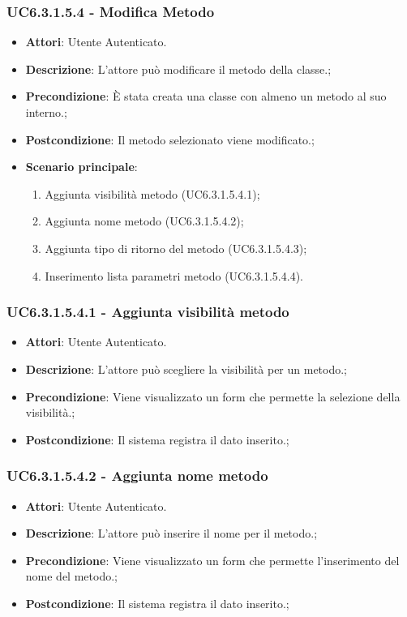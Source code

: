 \subsubsection{UC6.3.1.5.4 - Modifica Metodo} 
\label{sssec:UC6.3.1.5.4} 
\begin{itemize} 
\item \textbf{Attori}: Utente Autenticato.
\item \textbf{Descrizione}: L'attore può modificare il metodo della classe.;
\item \textbf{Precondizione}: È stata creata una classe con almeno un metodo al suo interno.;
\item \textbf{Postcondizione}: Il metodo selezionato viene modificato.;
\item \textbf{Scenario principale}: \begin{enumerate}\item Aggiunta visibilità metodo (UC6.3.1.5.4.1);\item Aggiunta nome metodo (UC6.3.1.5.4.2);\item Aggiunta tipo di ritorno del metodo (UC6.3.1.5.4.3);\item Inserimento lista parametri metodo (UC6.3.1.5.4.4). 
 \end{enumerate}
\end{itemize} 
\subsubsection{UC6.3.1.5.4.1 - Aggiunta visibilità metodo} 
\label{sssec:UC6.3.1.5.4.1} 
\begin{itemize} 
\item \textbf{Attori}: Utente Autenticato.
\item \textbf{Descrizione}: L'attore può scegliere la visibilità per un metodo.;
\item \textbf{Precondizione}: Viene visualizzato un form che permette la selezione della visibilità.;
\item \textbf{Postcondizione}: Il sistema registra il dato inserito.;
\end{itemize} 
\subsubsection{UC6.3.1.5.4.2 - Aggiunta nome metodo} 
\label{sssec:UC6.3.1.5.4.2} 
\begin{itemize} 
\item \textbf{Attori}: Utente Autenticato.
\item \textbf{Descrizione}: L'attore può inserire il nome per il metodo.;
\item \textbf{Precondizione}: Viene visualizzato un form che permette l'inserimento del nome del metodo.;
\item \textbf{Postcondizione}: Il sistema registra il dato inserito.;
\end{itemize} 
